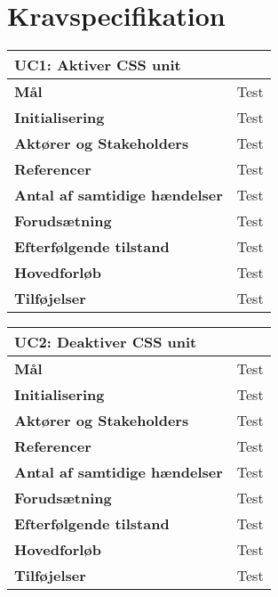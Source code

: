 \chapter{Kravspecifikation}

\begin{table}[htbp] \centering
\begin{tabular}{|l|l|} %
	\hline
\multicolumn{2}{|l|}{\textbf{UC1: Aktiver CSS unit}} \\\hline
\textbf{Mål}								&Test \\\hline
\textbf{Initialisering}					&Test \\\hline
\textbf{Aktører og Stakeholders}			&Test \\\hline
\textbf{Referencer}						&Test \\\hline
\textbf{Antal af samtidige hændelser}	&Test \\\hline
\textbf{Forudsætning}					&Test \\\hline
\textbf{Efterfølgende tilstand}			&Test \\\hline
\textbf{Hovedforløb}						&Test \\\hline
\textbf{Tilføjelser}						&Test \\\hline
	\end{tabular}
	\label{UC1} 
\end{table}

\begin{table}[htbp] \centering
\begin{tabular}{|l|l|} %
	\hline
\multicolumn{2}{|l|}{\textbf{UC2: Deaktiver CSS unit}} \\\hline
\textbf{Mål}								&Test \\\hline
\textbf{Initialisering}					&Test \\\hline
\textbf{Aktører og Stakeholders}			&Test \\\hline
\textbf{Referencer}						&Test \\\hline
\textbf{Antal af samtidige hændelser}	&Test \\\hline
\textbf{Forudsætning}					&Test \\\hline
\textbf{Efterfølgende tilstand}			&Test \\\hline
\textbf{Hovedforløb}						&Test \\\hline
\textbf{Tilføjelser}						&Test \\\hline
	\end{tabular}
	\label{UC2} 
\end{table}

